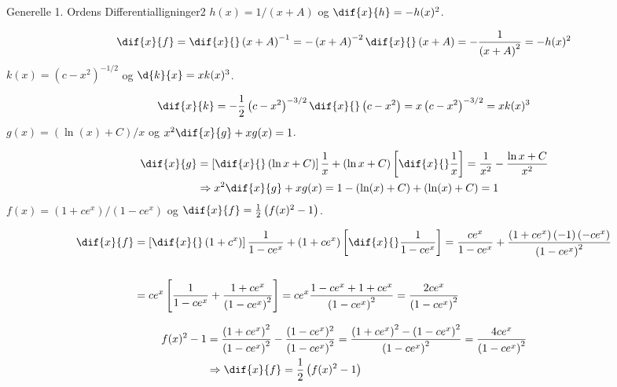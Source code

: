 \begin{opgave}{Generelle 1. Ordens Differentialligninger}{2}
\opg $h(x) = 1/ \left( x+A \right)$ og $\dif{x}{h} = -h(x)^2$.

$$\dif{x}{f} = \dif{x}{}\left( x+A \right)^{-1} = - \left( x+A \right)^{-2} \dif{x}{}\left( x+A \right) = - \frac{1}{\left( x + A \right)^2} = -h(x)^2$$
\vspace{2mm}
\opg $k(x) = \left( c-x^2 \right)^{-1/2}$ og $\d{k}{x} = x k(x)^3$.

$$\dif{x}{k} = - \frac{1}{2} \left( c-x^2 \right)^{-3/2}  \dif{x}{}\left( c-x^2 \right) = x \left( c-x^2 \right)^{-3/2} = x k(x)^3$$
\vspace{2mm}
\opg $g(x) = \left( \ln (x) + C \right)/x$ og $x^2 \dif{x}{g} + x g(x) = 1$.

\begin{align*}
	\dif{x}{g} &= \left[ \dif{x}{}\left( \ln x + C \right) \right] \frac{1}{x} + \left( \ln x + C \right)  \left[ \dif{x}{}\frac{1}{x} \right]  = \frac{1}{x^2} - \frac{\ln x + C}{x^2} \\ &\Rightarrow x^2 \dif{x}{g} + xg(x) = 1 - \left( \ln (x) + C \right) + \left( \ln (x) + C \right) = 1
\end{align*}
\vspace{2mm}
\opg $f(x) = \left( 1+ce^x \right)/\left( 1-ce^x \right)$ og $\dif{x}{f} = \frac{1}{2} \left( f(x)^2 -1 \right)$.

\begin{align*}
\dif{x}{f} &= \left[ \dif{x}{}\left( 1+c^x \right) \right] \frac{1}{1-ce^x} + \left( 1+ce^x \right) \left[ \dif{x}{}\frac{1}{1-ce^x} \right] = \frac{ce^x}{1-ce^x} +  \frac{\left( 1+ce^x \right) \left( -1 \right) \left( -ce^x \right)}{\left( 1-ce^x \right)^2}\\\\
&= ce^x \left[ \frac{1}{1-ce^x} + \frac{1+ce^x}{\left( 1-ce^x \right)^2} \right] = ce^x \frac{1-ce^x + 1+ce^x}{\left( 1-ce^x \right)^2} = \frac{2ce^x}{\left( 1-ce^x \right)^2}
\end{align*}

\begin{align*}
	f(x)^2 - 1  &=  \frac{\left( 1+ce^x \right)^2}{\left( 1-ce^x \right)^2} - \frac{(1-ce^x)^2}{\left( 1-ce^x \right)^2} = \frac{\left( 1+ce^x \right)^2 - \left( 1-ce^x \right)^2}{\left( 1-ce^x \right)^2} = \frac{4ce^x}{\left( 1-ce^x \right)^2} \\
	&\Rightarrow \dif{x}{f} = \frac{1}{2} \left( f(x)^2 -1 \right)
\end{align*}
\end{opgave}

